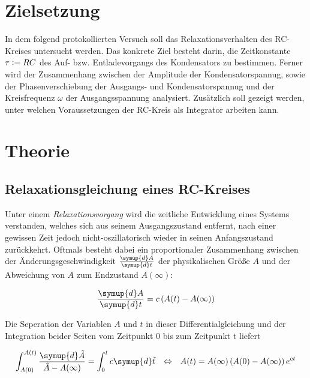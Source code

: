 %

%
\section{Zielsetzung}
\label{sec:Zielsetzung}
In dem folgend protokollierten Versuch soll das Relaxationsverhalten des RC-Kreises untersucht werden. Das konkrete
Ziel besteht darin, die Zeitkonstante $\tau \vcentcolon = RC$ des Auf- bzw. Entladevorgangs des Kondensators zu bestimmen.
Ferner wird der Zusammenhang zwischen der Amplitude der Kondensatorspannug, sowie der Phasenverschiebung der Ausgangs- und
Kondensatorspannug und der Kreisfrequenz $\omega$ der Ausgangsspannung analysiert. Zusätzlich soll gezeigt werden, unter 
welchen Voraussetzungen der RC-Kreis als Integrator arbeiten kann.

\section{Theorie}
\label{sec:Theorie}

\subsection{Relaxationsgleichung eines RC-Kreises}
Unter einem \emph{Relaxationsvorgang} wird die zeitliche Entwicklung eines Systems verstanden, welches sich aus seinem 
Ausgangszustand entfernt, nach einer gewissen Zeit jedoch nicht-oszillatorisch wieder in seinen Anfangszustand zurückkehrt.
Oftmals besteht dabei ein proportionaler Zusammenhang zwischen der Änderungsgeschwindigkeit $\frac{\symup{d}A}{\symup{d}t}$
der physikalischen Größe $A$ und der Abweichung von $A$ zum Endzustand $A\left(\infty\right)$:

\begin{equation}
\label{eqn:Proportionalitaet}
    \frac{\symup{d}A}{\symup{d}t} = c\left(A(t) - A(\infty)\right)
\end{equation}

\noindent Die Seperation der Variablen $A$ und $t$ in dieser Differentialgleichung und der Integration beider Seiten vom Zeitpunkt 0
bis zum Zeitpunkt t liefert

\begin{align}
\label{eqn:Amplitudenverlauf}
    \int_{A(0)}^{A(t)}\frac{\symup{d}\tilde{A}}{\tilde{A} - A(\infty)} &= \int_{0}^{t}c\symup{d}\tilde{t}  &\Leftrightarrow & &A(t) = A(\infty) \left(A(0) - A(\infty)\right)e^{ct}
\end{align}

